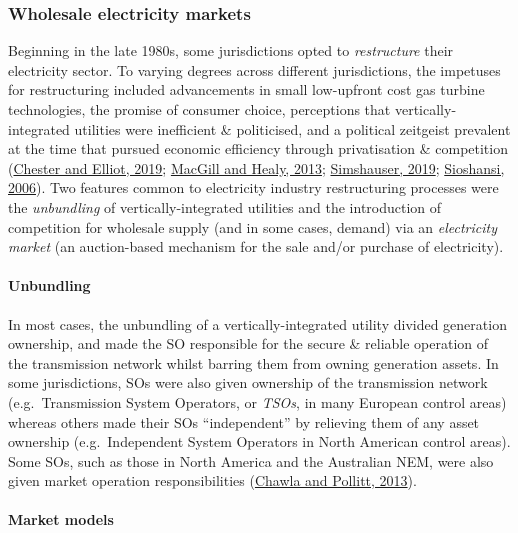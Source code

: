 \documentclass[12pt,a4paper,]{report}
\begin{document}
\hypertarget{wholesale-electricity-markets}{%
\subsubsection{Wholesale electricity
markets}\label{wholesale-electricity-markets}}

Beginning in the late 1980s, some jurisdictions opted to
\emph{restructure} their electricity sector. To varying degrees across
different jurisdictions, the impetuses for restructuring included
advancements in small low-upfront cost gas turbine technologies, the
promise of consumer choice, perceptions that vertically-integrated
utilities were inefficient \& politicised, and a political zeitgeist
prevalent at the time that pursued economic efficiency through
privatisation \& competition
(\protect\hyperlink{ref-chesterEnergyProblemRepresentation2019}{Chester
and Elliot, 2019};
\protect\hyperlink{ref-macgillElectricityIndustryReform2013}{MacGill and
Healy, 2013};
\protect\hyperlink{ref-simshauserLessonsAustraliaNational2019}{Simshauser,
2019};
\protect\hyperlink{ref-sioshansiElectricityMarketReform2006}{Sioshansi,
2006}). Two features common to electricity industry restructuring
processes were the \emph{unbundling} of vertically-integrated utilities
and the introduction of competition for wholesale supply (and in some
cases, demand) via an \emph{electricity market} (an auction-based
mechanism for the sale and/or purchase of electricity).

\hypertarget{unbundling}{%
\paragraph{Unbundling}\label{unbundling}}

In most cases, the unbundling of a vertically-integrated utility divided
generation ownership, and made the SO responsible for the secure \&
reliable operation of the transmission network whilst barring them from
owning generation assets. In some jurisdictions, SOs were also given
ownership of the transmission network (e.g.~Transmission System
Operators, or \emph{TSOs}, in many European control areas) whereas
others made their SOs ``independent'' by relieving them of any asset
ownership (e.g.~Independent System Operators in North American control
areas). Some SOs, such as those in North America and the Australian NEM,
were also given market operation responsibilities
(\protect\hyperlink{ref-chawlaGlobalTrendsElectricity2013}{Chawla and
Pollitt, 2013}).

\hypertarget{market-models}{%
\paragraph{Market models}\label{market-models}}
\end{document}
